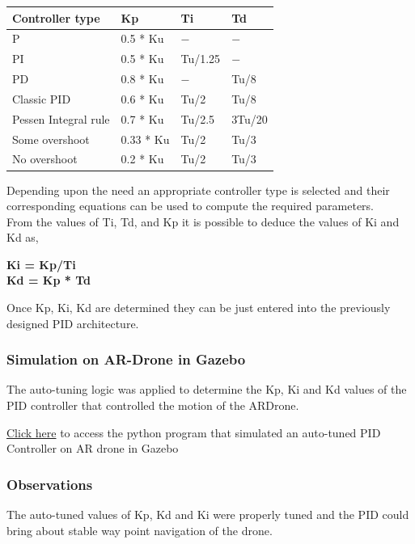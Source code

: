 \documentclass[a4paper,12pt,oneside]{book}
\begin{document}
\begin{tabular}{|p{10em}|p{8em}|p{4em}|p{4em}|}\hline
    \textbf{Controller type} & \textbf{Kp} &\textbf{Ti} & \textbf{Td}\\\hline
    P  & 0.5 * Ku & $-$ & $-$\\\hline
      PI & 0.5 * Ku & Tu/1.25 & $-$\\\hline
PD & 0.8 * Ku & $-$ & Tu/8 \\\hline
Classic PID & 0.6 * Ku & Tu/2 & Tu/8\\\hline
  Pessen Integral rule & 0.7 * Ku & Tu/2.5 & 3Tu/20 \\\hline
Some overshoot & 0.33 * Ku & Tu/2 & Tu/3\\\hline
No overshoot & 0.2 * Ku & Tu/2 & Tu/3\\\hline

\end{tabular}
\vspace{1em}


Depending upon the need an appropriate controller type is selected and their corresponding equations can be used to compute the required parameters.\\
From the values of Ti, Td, and Kp it is possible to deduce the values of 
Ki and Kd as,
\begin{center}
    \textbf{Ki = Kp/Ti}\\
    \textbf{Kd = Kp * Td}
\end{center} 
\vspace{1em}
Once Kp, Ki, Kd are determined they can be just entered into the previously designed PID architecture.


\subsubsection{Simulation on AR-Drone in Gazebo}
The auto-tuning logic was applied to determine the Kp, Ki and Kd values of the PID controller that controlled the motion of the ARDrone.

\href{https://github.com/eYSIP-2018/Autotuning-of-Controller-For-Drone/blob/karthik/auto-ar.py}{Click here} to access the python program that simulated an auto-tuned PID Controller on AR drone in Gazebo\\

\subsubsection{Observations}
The auto-tuned values of Kp, Kd and Ki were properly tuned and the PID could bring about stable way point navigation of the drone.\\
\end{document}
